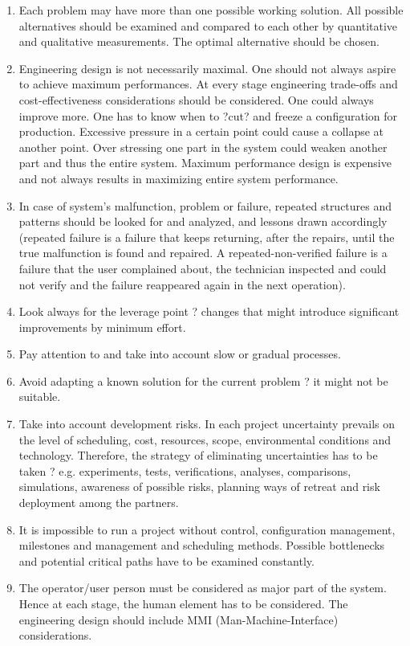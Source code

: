 \documentclass[11pt]{article}
\begin{document}
\begin{enumerate}
\item Each problem may have more than one possible working solution. All possible alternatives should be examined and compared to each other by quantitative and qualitative measurements. The optimal alternative should be chosen.
\item Engineering design is not necessarily maximal. One should not always aspire to achieve maximum performances. At every stage engineering trade-offs and cost-effectiveness considerations should be considered. One could always improve more. One has to know when to ?cut? and freeze a configuration for production. Excessive pressure in a certain point could cause a collapse at another point. Over stressing one part in the system could weaken another part and thus the entire system. Maximum performance design is expensive and not always results in maximizing entire system performance.
\item In case of system's malfunction, problem or failure, repeated structures and patterns should be looked for and analyzed, and lessons drawn accordingly (repeated failure is a failure that keeps returning, after the repairs, until the true malfunction is found and repaired. A repeated-non-verified failure is a failure that the user complained about, the technician inspected and could not verify and the failure reappeared again in the next operation).
\item Look always for the leverage point ? changes that might introduce significant improvements by minimum effort.
\item Pay attention to and take into account slow or gradual processes.
\item Avoid adapting a known solution for the current problem ? it might not be suitable.
\item Take into account development risks. In each project uncertainty prevails on the level of scheduling, cost, resources, scope, environmental conditions and technology. Therefore, the strategy of eliminating uncertainties has to be taken ? e.g. experiments, tests, verifications, analyses, comparisons, simulations, awareness of possible risks, planning ways of retreat and risk deployment among the partners.
\item It is impossible to run a project without control, configuration management, milestones and management and scheduling methods. Possible bottlenecks and potential critical paths have to be examined constantly.
\item The operator/user person must be considered as major part of the system. Hence at each stage, the human element has to be considered. The engineering design should include MMI (Man-Machine-Interface) considerations.

\end{enumerate}
\end{document}
